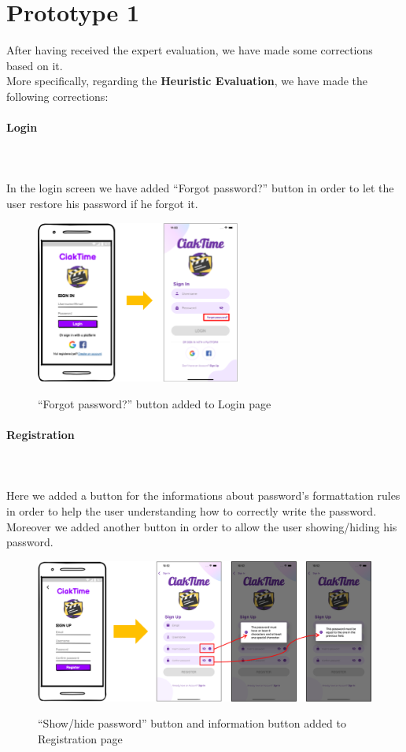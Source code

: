\documentclass[12pt, a4paper]{article}
\numberwithin{figure}{section}
\begin{document}

\newpage

\section{Prototype 1}

After having received the expert evaluation, we have made some corrections based on it.\\
More specifically, regarding the \textbf{Heuristic Evaluation}, we have made the following corrections:
\paragraph{Login}\mbox{}\\\\
In the login screen we have added “Forgot password?” button in order to let the user restore his password
if he forgot it.
\begin{figure}[H]
	\centering
	\includegraphics[width=0.6\textwidth]{images/prototype1/login.png}\\
	\caption{“Forgot password?” button added to Login page}
\end{figure}
\paragraph{Registration}
\mbox{}\\\\
Here we added a button for the informations about password's formattation rules in order to help the user
understanding how to correctly write the password. Moreover we added another button in order to allow the user
showing/hiding his password.
\begin{figure}[H]
	\centering
	\includegraphics[width=1\textwidth]{images/prototype1/registration.png}\\
	\caption{“Show/hide password” button and information button added to Registration page}
\end{figure}
\end{document}
